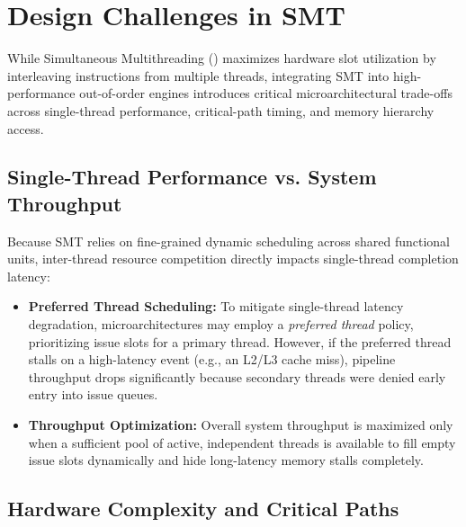 \section{Design Challenges in SMT}
\label{sec:smt_design_challenges}

While Simultaneous Multithreading () maximizes hardware slot utilization by interleaving instructions from multiple threads, integrating SMT into high-performance out-of-order engines introduces critical microarchitectural trade-offs across single-thread performance, critical-path timing, and memory hierarchy access.

\subsection{Single-Thread Performance vs. System Throughput}

Because SMT relies on fine-grained dynamic scheduling across shared functional units, inter-thread resource competition directly impacts single-thread completion latency:
\begin{itemize}
    \item \textbf{Preferred Thread Scheduling:} To mitigate single-thread latency degradation, microarchitectures may employ a \textit{preferred thread} policy, prioritizing issue slots for a primary thread. However, if the preferred thread stalls on a high-latency event (e.g., an L2/L3 cache miss), pipeline throughput drops significantly because secondary threads were denied early entry into issue queues.
    \item \textbf{Throughput Optimization:} Overall system throughput is maximized only when a sufficient pool of active, independent threads is available to fill empty issue slots dynamically and hide long-latency memory stalls completely.
\end{itemize}

\subsection{Hardware Complexity and Critical Paths}

